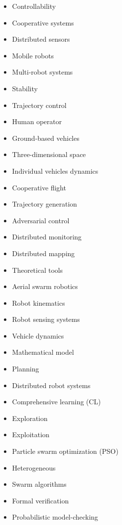 \documentclass{article}
\begin{document}
\begin{itemize}
    \item Controllability \cite{8424838}
    \item Cooperative systems \cite{8424838}
    \item Distributed sensors \cite{8424838}
    \item Mobile robots \cite{8424838}
    \item Multi-robot systems \cite{8424838}
    \item Stability \cite{8424838}
    \item Trajectory control \cite{8424838}
    \item Human operator \cite{8424838}
    \item Ground-based vehicles \cite{8424838}
    \item Three-dimensional space \cite{8424838}
    \item Individual vehicles dynamics \cite{8424838}
    \item Cooperative flight \cite{8424838}
    \item Trajectory generation \cite{8424838}
    \item Adversarial control \cite{8424838}
    \item Distributed monitoring \cite{8424838}
    \item Distributed mapping \cite{8424838}
    \item Theoretical tools \cite{8424838}
    \item Aerial swarm robotics \cite{8424838}
    \item Robot kinematics \cite{8424838}
    \item Robot sensing systems \cite{8424838}
    \item Vehicle dynamics \cite{8424838}
    \item Mathematical model \cite{8424838}
    \item Planning \cite{8424838}
    \item Distributed robot systems \cite{8424838}
    \item Comprehensive learning (CL)
    \item Exploration \cite{LYNN201511}
    \item Exploitation \cite{LYNN201511}
    \item Particle swarm optimization (PSO) \cite{LYNN201511}
    \item Heterogeneous \cite{LYNN201511}
    \item Swarm algorithms \cite{KONUR2012199}
    \item Formal verification \cite{KONUR2012199}
    \item Probabilistic model-checking \cite{KONUR2012199}
  \end{itemize}
\end{document}
